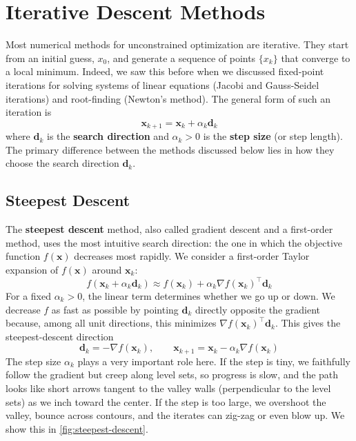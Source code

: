 \section{Iterative Descent Methods}
Most numerical methods for unconstrained optimization are iterative. They start from an initial guess, $x_0$, and generate a sequence of points $\{x_k\}$ that converge to a local minimum. Indeed, we saw this before when we discussed fixed-point iterations for solving systems of linear equations (Jacobi and Gauss-Seidel iterations) and root-finding (Newton's method). The general form of such an iteration is
\begin{equation}
    \mathbf{x}_{k+1} = \mathbf{x}_k + \alpha_k \mathbf{d}_k
    \label{eq:iterative_update}
\end{equation}
where $\mathbf{d}_k$ is the \textbf{search direction} and $\alpha_k > 0$ is the \textbf{step size} (or step length). The primary difference between the methods discussed below lies in how they choose the search direction $\mathbf{d}_k$.

\subsection{Steepest Descent}
\label{sec:steepest-descent}
The \textbf{steepest descent} method, also called gradient descent and a first-order method, uses the most intuitive search direction: the one in which the objective function $f(\mathbf{x})$ decreases most rapidly. We consider a first-order Taylor expansion of $f(\mathbf{x})$ around $\mathbf{x}_k$:
\begin{equation}
f(\mathbf{x}_k+\alpha_k\mathbf{d}_k)\approx f(\mathbf{x}_k) + \alpha_k \nabla f(\mathbf{x}_k)^{\top}\mathbf{d}_k
\end{equation}
For a fixed $\alpha_k>0$, the linear term determines whether we go up or down. We decrease $f$ as fast as possible by pointing $\mathbf{d}_k$ directly opposite the gradient because, among all unit directions, this minimizes $\nabla f(\mathbf{x}_k)^{\top}\mathbf{d}_k$. This gives the steepest-descent direction
\begin{equation}
\mathbf{d}_k=-\nabla f(\mathbf{x}_k), \qquad
\mathbf{x}_{k+1}=\mathbf{x}_k-\alpha_k\nabla f(\mathbf{x}_k)
\end{equation}
The step size $\alpha_k$ plays a very important role here. If the step is tiny, we faithfully follow the gradient but creep along level sets, so progress is slow, and the path looks like short arrows tangent to the valley walls (perpendicular to the level sets) as we inch toward the center. If the step is too large, we overshoot the valley, bounce across contours, and the iterates can zig-zag or even blow up. We show this in \autoref{fig:steepest-descent}.

